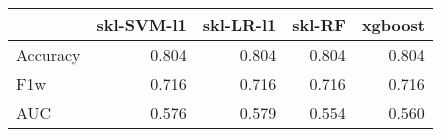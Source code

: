 \begin{tabular}{lrrrr}
\toprule
{} &  skl-SVM-l1 &  skl-LR-l1 &  skl-RF &  xgboost \\
\midrule
Accuracy &       0.804 &      0.804 &   0.804 &    0.804 \\
F1w      &       0.716 &      0.716 &   0.716 &    0.716 \\
AUC      &       0.576 &      0.579 &   0.554 &    0.560 \\
\bottomrule
\end{tabular}
